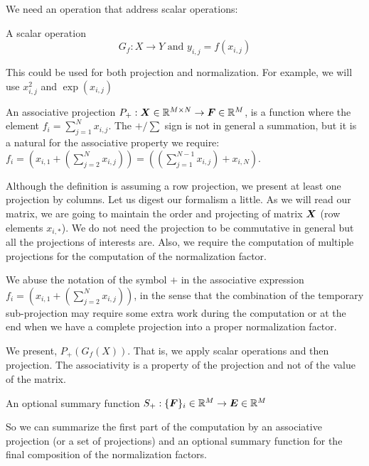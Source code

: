 \documentclass[acmsmall]{acmart}
\begin{document}
We need an operation that address scalar operations:
\begin{definition}
  A scalar operation
  \begin{equation}
    G_f: X \rightarrow Y \text{ and }  y_{i,j} = f(x_{i,j})
  \end{equation}
\end{definition}
This could be used for both projection and normalization. For example,
we will use $x_{i,j}^2$ and $\exp(x_{i,j})$


\begin{definition}
An associative projection $P_+: {\boldsymbol X}\in\mathbb{R}^{M\times N} \rightarrow
{\boldsymbol F} \in \mathbb{R}^{M}$, is a function where the element $f_i =
\sum_{j=1}^N x_{i,j}$. The $+/\sum$ sign is not in general a
summation, but it is a natural for the associative property we
require: $f_i = (x_{i,1} + (\sum_{j=2}^N x_{i,j})) =
((\sum_{j=1}^{N-1} x_{i,j}) + x_{i,N}) $.
\end{definition}

Although the definition is assuming a row projection, we present at
least one projection by columns.  Let us digest our formalism a
little.  As we will read our matrix, we are going to maintain the
order and projecting of matrix ${\boldsymbol X}$ (row elements $x_{i,*}$). We
do not need the projection to be commutative in general but all the
projections of interests are. Also, we require the computation of
multiple projections for the computation of the normalization factor.

We abuse the notation of the symbol $+$ in the associative expression
$f_i = (x_{i,1} + (\sum_{j=2}^N x_{i,j}))$, in the sense that the
combination of the temporary sub-projection may require some extra
work during the computation or at the end when we have a complete
projection into a proper normalization factor.

We present, $P_+(G_f(X))$. That is, we apply scalar operations and
then projection. The associativity is a property of the projection and
not of the value of the matrix.


\begin{definition}
  An optional summary function $S_+: \{{\boldsymbol F}\}_i\in\mathbb{R}^{ M}
  \rightarrow {\boldsymbol E} \in \mathbb{R}^{M}$
\end{definition}
So we can summarize the first part of the computation by an
associative projection (or a set of projections) and an optional
summary function for the final composition of the normalization
factors.
\end{document}
